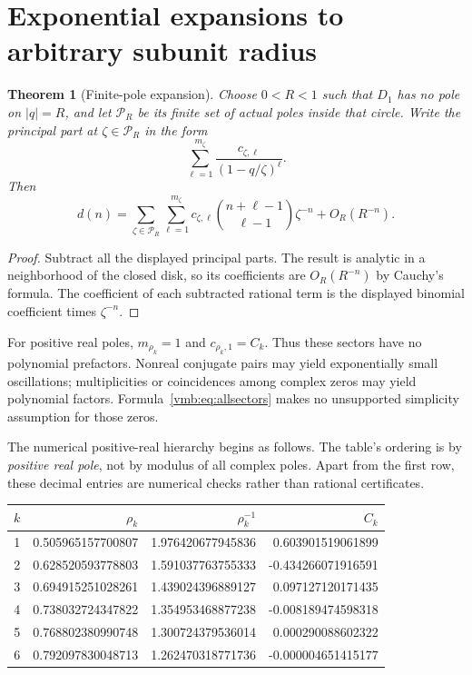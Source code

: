 \documentclass[11pt,a4paper]{article}
\numberwithin{equation}{section}
\newtheorem{theorem}{Theorem}[section]
\theoremstyle{definition}\newtheorem{definition}[theorem]{Definition}
\theoremstyle{remark}\newtheorem{remark}[theorem]{Remark}
\newcommand{\calP}{\mathcal P}
\begin{document}
\section{Exponential expansions to arbitrary subunit radius}

\begin{theorem}[Finite-pole expansion]\label{vmb:thm:sectors}
Choose \(0<R<1\) such that \(D_1\) has no pole on \(|q|=R\), and let
\(\calP_R\) be its finite set of actual poles inside that circle. Write
the principal part at \(\zeta\in\calP_R\) in the form
\[
\sum_{\ell=1}^{m_\zeta}
\frac{c_{\zeta,\ell}}{(1-q/\zeta)^\ell}.
\]
Then
\begin{equation}\label{vmb:eq:allsectors}
\boxed{\quad d(n)=
\sum_{\zeta\in\calP_R}\sum_{\ell=1}^{m_\zeta}
 c_{\zeta,\ell}\binom{n+\ell-1}{\ell-1}\zeta^{-n}
 +O_R(R^{-n}).\quad}
\end{equation}
\end{theorem}
\begin{proof}
Subtract all the displayed principal parts. The result is analytic in a
neighborhood of the closed disk, so its coefficients are \(O_R(R^{-n})\)
by Cauchy's formula. The coefficient of each subtracted rational term is
the displayed binomial coefficient times \(\zeta^{-n}\).
\end{proof}

For positive real poles, \(m_{\rho_k}=1\) and
\(c_{\rho_k,1}=C_k\). Thus these sectors have no polynomial
prefactors. Nonreal conjugate pairs may yield exponentially small
oscillations; multiplicities or coincidences among complex zeros may
yield polynomial factors. Formula~\eqref{vmb:eq:allsectors} makes no
unsupported simplicity assumption for those zeros.

The numerical positive-real hierarchy begins as follows. The table's
ordering is by \emph{positive real pole}, not by modulus of all complex
poles. Apart from the first row, these decimal entries are numerical
checks rather than rational certificates.
\begin{center}
\begin{tabular}{@{}rrrr@{}}
\toprule
\(k\)&\(\rho_k\)&\(\rho_k^{-1}\)&\(C_k\)\\
\midrule
1&0.505965157700807&1.976420677945836&\phantom{-}0.603901519061899\\
2&0.628520593778803&1.591037763755333&-0.434266071916591\\
3&0.694915251028261&1.439024396889127&\phantom{-}0.097127120171435\\
4&0.738032724347822&1.354953468877238&-0.008189474598318\\
5&0.768802380990748&1.300724379536014&\phantom{-}0.000290088602322\\
6&0.792097830048713&1.262470318771736&-0.000004651415177\\
\bottomrule
\end{tabular}
\end{center}
\end{document}
